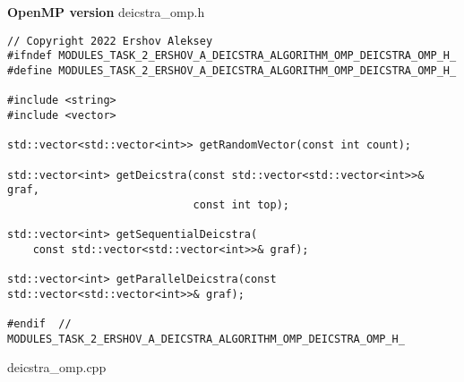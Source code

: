 \documentclass{report}
\begin{document}
\textbf{OpenMP version}
\newline
\newline deicstra\_omp.h
\begin{lstlisting}
// Copyright 2022 Ershov Aleksey
#ifndef MODULES_TASK_2_ERSHOV_A_DEICSTRA_ALGORITHM_OMP_DEICSTRA_OMP_H_
#define MODULES_TASK_2_ERSHOV_A_DEICSTRA_ALGORITHM_OMP_DEICSTRA_OMP_H_

#include <string>
#include <vector>

std::vector<std::vector<int>> getRandomVector(const int count);

std::vector<int> getDeicstra(const std::vector<std::vector<int>>& graf,
                             const int top);

std::vector<int> getSequentialDeicstra(
    const std::vector<std::vector<int>>& graf);

std::vector<int> getParallelDeicstra(const std::vector<std::vector<int>>& graf);

#endif  // MODULES_TASK_2_ERSHOV_A_DEICSTRA_ALGORITHM_OMP_DEICSTRA_OMP_H_

\end{lstlisting}
deicstra\_omp.cpp
\end{document}
